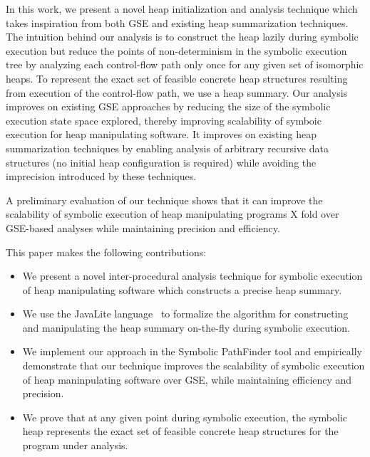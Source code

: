 In this work, we present a novel heap initialization and analysis
technique which takes inspiration from both GSE and existing heap
summarization techniques. The intuition behind our analysis is to
construct the heap lazily during symbolic execution but reduce the
points of non-determinism in the symbolic execution tree by analyzing
each control-flow path only once for any given set of isomorphic
heaps. To represent the exact set of feasible concrete heap structures
resulting from execution of the control-flow path, we use a heap
summary.  Our analysis improves on existing GSE approaches by reducing
the size of the symbolic execution state space explored, thereby
improving scalability of symboic execution for heap manipulating
software. It improves on existing heap summarization techniques by
enabling analysis of arbitrary recursive data structures (no initial
heap configuration is required) while avoiding the imprecision
introduced by these techniques.

  A preliminary evaluation of our technique
shows that it can improve the scalability of symbolic execution
of heap manipulating programs X fold over GSE-based analyses
while maintaining precision and efficiency. 

This paper makes the following contributions:
\begin{itemize}
\item{We present a novel inter-procedural analysis technique for 
symbolic execution of heap manipulating software which constructs 
a precise heap summary.}
\item{We use the JavaLite language~\cite{saints-MS} to formalize 
the algorithm for constructing and manipulating the heap summary
on-the-fly during symbolic execution.}
\item{We implement our approach in the Symbolic PathFinder tool and
empirically demonstrate that our technique improves
the scalability of symbolic execution of heap maninpulating software
over GSE, while maintaining efficiency and precision.}
\item{We prove that at any given point during symbolic execution, the symbolic 
heap represents the exact set of feasible concrete heap structures 
for the program under analysis.}
 \end{itemize}

  

